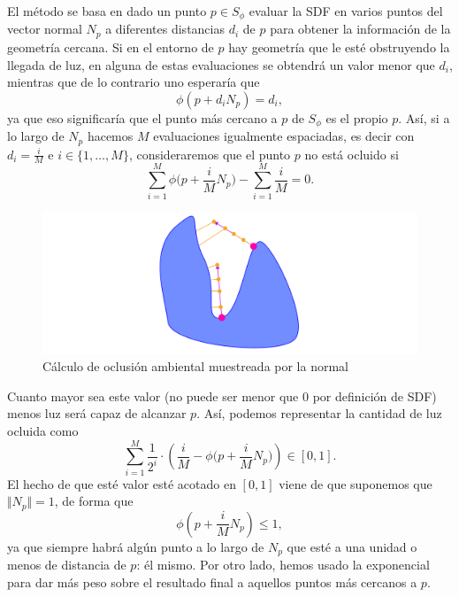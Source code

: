 El método se basa en dado un punto $p\in S_{\phi}$ evaluar la SDF en varios puntos del vector normal $N_p$ a diferentes distancias $d_i$ de $p$ para obtener la información de la geometría cercana. Si en el entorno de $p$ hay geometría que le esté obstruyendo la llegada de luz, en alguna de estas evaluaciones se obtendrá un valor menor que $d_i$, mientras que de lo contrario uno esperaría que
\begin{equation*}
    \phi(p + d_i N_p) = d_i,
\end{equation*}
ya que eso significaría que el punto más cercano a $p$ de $S_{\phi}$ es el propio $p$. Así, si a lo largo de $N_p$ hacemos $M$ evaluaciones igualmente espaciadas, es decir con $d_i = \frac{i}{M}$ e $i\in \{1,\dots, M\}$, consideraremos que el punto $p$ no está ocluido si
\begin{equation*}
    \sum_{i=1}^M \phi\Big(p + \frac{i}{M} N_p\Big) - \sum_{i=1}^M \frac{i}{M} = 0.
\end{equation*}
\begin{figure}[ht!]
    \centering
    \includegraphics[width=\textwidth]{Plantilla-TFG-master/img/diagramaAO.png}
    \caption{Cálculo de oclusión ambiental muestreada por la normal}
    \label{fig:sombras4}
\end{figure}
Cuanto mayor sea este valor (no puede ser menor que $0$ por definición de SDF) menos luz será capaz de alcanzar $p$. Así, podemos representar la cantidad de luz ocluida como
\begin{equation*}
    \sum_{i=1}^M \frac{1}{2^i}\cdot \left(\frac{i}{M} - \phi\Big(p + \frac{i}{M} N_p\Big)\right)\in [0,1].
\end{equation*}
El hecho de que esté valor esté acotado en $[0,1]$ viene de que suponemos que $\Vert N_p\Vert = 1$, de forma que
\begin{equation*}
    \phi\left(p + \frac{i}{M} N_p\right) \le 1,
\end{equation*}
ya que siempre habrá algún punto a lo largo de $N_p$ que esté a una unidad o menos de distancia de $p$: él mismo. Por otro lado, hemos usado la exponencial para dar más peso sobre el resultado final a aquellos puntos más cercanos a $p$.\newline

